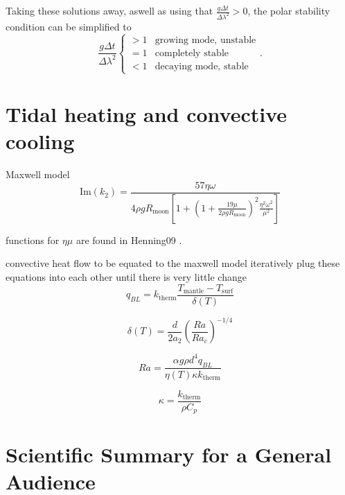 \documentclass[12pt, onecolumn]{revtex4-2}    %
\begin{document}
Taking these solutions away, aswell as using that $\frac{g \Delta t}{\Delta \lambda ^2} > 0$, the polar stability condition can be simplified to
\begin{equation} \label{appeq:polarstability}
    \frac{g\Delta t}{\Delta \lambda ^2}
    \begin{cases}
        > 1 & \text{growing mode, unstable} \\
        = 1 & \text{completely stable}      \\
        < 1 & \text{decaying mode, stable}
    \end{cases}
    .
\end{equation}

\section{Tidal heating and convective cooling} \label{app:convcooling}

Maxwell model
\begin{equation}
    \text{Im}(k_2) = \frac{57 \eta \omega}{4 \rho g R_{\text{moon}}\left[1 + \left(1+\frac{19\mu}{2\rho g R_{\text{moon}}}\right)^2 \frac{\eta^2 \omega^2}{\mu^2}\right]}
\end{equation}

functions for $\eta \mu$ are found in Henning09 \cite{Henning2009}.

convective heat flow to be equated to the maxwell model
iteratively plug these equations into each other until there is very little change
\begin{equation}
    q_{BL} = k_{\text{therm}} \frac{T_{\text{mantle}} - T_{\text{surf}}}{\delta(T)}
\end{equation}

\begin{equation}
    \delta(T) = \frac{d}{2 a_2} \left(\frac{Ra}{Ra_c}\right)^{-1/4}
\end{equation}

\begin{equation}
    Ra = \frac{\alpha g \rho d^4 q_{BL}}{\eta(T) \kappa k_{\text{therm}}}
\end{equation}

\begin{equation}
    \kappa = \frac{k_{\text{therm}}}{\rho C_p}
\end{equation}

\clearpage

\section*{Scientific Summary for a General Audience}
\end{document}
